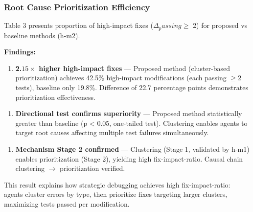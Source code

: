 \subsubsection{Root Cause Prioritization Efficiency}

Table 3 presents proportion of high-impact fixes ($\Delta _passing \geq$ 2) for proposed vs baseline methods (h-m2).

\begin{table}[htbp]
\centering
{}
\end{table}

\textbf{Findings:}

\begin{enumerate}
\item \textbf{2.$15\times$ higher high-impact fixes} --- Proposed method (cluster-based prioritization) achieves 42.5\% high-impact modifications (each passing $\geq 2$ tests), baseline only 19.8\%. Difference of 22.7 percentage points demonstrates prioritization effectiveness.
\end{enumerate}

\begin{enumerate}
\item \textbf{Directional test confirms superiority} --- Proposed method statistically greater than baseline (p < 0.05, one-tailed test). Clustering enables agents to target root causes affecting multiple test failures simultaneously.
\end{enumerate}

\begin{enumerate}
\item \textbf{Mechanism Stage 2 confirmed} --- Clustering (Stage 1, validated by h-m1) enables prioritization (Stage 2), yielding high fix-impact-ratio. Causal chain clustering $\rightarrow$ prioritization verified.
\end{enumerate}

This result explains how strategic debugging achieves high fix-impact-ratio: agents cluster errors by type, then prioritize fixes targeting larger clusters, maximizing tests passed per modification.


